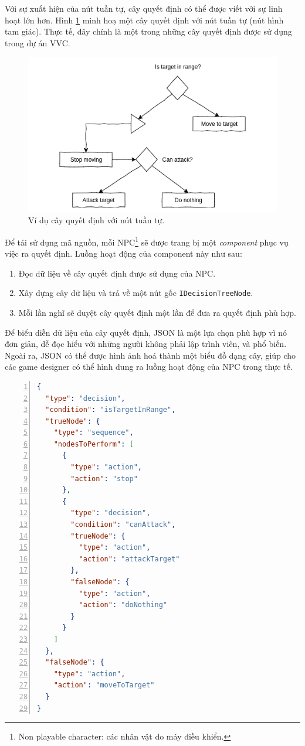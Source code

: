 \documentclass[12pt]{report}
\newcommand{\project}{VVC}
\begin{document}
Với sự xuất hiện của nút tuần tự, cây quyết định có thể được viết với sự linh hoạt lớn hơn. Hình \ref{fig:dectreereal} minh hoạ một cây quyết định với nút tuần tự (nút hình tam giác). Thực tế, đây chính là một trong những cây quyết định được sử dụng trong dự án \project.
\begin{figure}[H]
  \centering
    \includegraphics[width=13cm]{Pics/Chap5/realdectree.png}
  \caption{Ví dụ cây quyết định với nút tuần tự.}
  \label{fig:dectreereal}
\end{figure}

Để tái sử dụng mã nguồn, mỗi NPC\footnote{Non playable character: các nhân vật do máy điều khiển.} sẽ được trang bị một \textit{component} phục vụ việc ra quyết định. Luồng hoạt động của component này như sau:
\begin{enumerate}
	\item Đọc dữ liệu về cây quyết định được sử dụng của NPC.
	\item Xây dựng cây dữ liệu và trả về một nút gốc \texttt{IDecisionTreeNode}.
	\item Mỗi lần nghĩ sẽ duyệt cây quyết định một lần để đưa ra quyết định phù hợp.
\end{enumerate}

Để biểu diễn dữ liệu của cây quyết định, JSON là một lựa chọn phù hợp vì nó đơn giản, dễ đọc hiểu với những người không phải lập trình viên, và phổ biến. Ngoài ra, JSON có thể được hình ảnh hoá thành một biểu đồ dạng cây, giúp cho các game designer có thể hình dung ra luồng hoạt động của NPC trong thực tế. 
\begin{lstlisting}[frame=lines, language=json, basicstyle=\footnotesize\ttfamily, numbers=left, numberstyle=\tiny\color{black},caption= {Một file JSON mô tả cây quyết định}]
{
  "type": "decision",
  "condition": "isTargetInRange",
  "trueNode": {
    "type": "sequence",
    "nodesToPerform": [
      {
        "type": "action",
        "action": "stop"
      },
      {
        "type": "decision",
        "condition": "canAttack",
        "trueNode": {
          "type": "action",
          "action": "attackTarget"
        },
        "falseNode": {
          "type": "action",
          "action": "doNothing"
        }
      }
    ]
  },
  "falseNode": {
    "type": "action",
    "action": "moveToTarget"
  }
}
\end{lstlisting}
\end{document}
